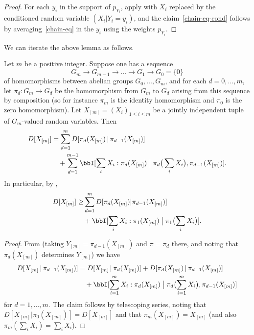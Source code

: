   \begin{proof}\leanok
  For each $y_i$ in the support of $p_{Y_i}$, apply  with $X_i$ replaced by the conditioned random variable $(X_i|Y_i=y_i)$, and the claim~\eqref{chain-eq-cond} follows by averaging~\eqref{chain-eq} in the $y_i$ using the weights $p_{Y_i}$.
  \end{proof}

  We can iterate the above lemma as follows.

  \begin{lemma}\label{multidist-chain-rule-iter}\leanok  Let $m$ be a positive integer.
    Suppose one has a sequence
    \begin{equation}\label{g-seq}
      G_m \to G_{m-1} \to \dots \to G_1 \to G_0 = \{0\}
    \end{equation}
    of homomorphisms between abelian groups $G_0,\dots,G_m$, and for each $d=0,\dots,m$, let $\pi_d : G_m \to G_d$ be the homomorphism from $G_m$ to $G_d$ arising from this sequence by composition (so for instance $\pi_m$ is the identity homomorphism and $\pi_0$ is the zero homomorphism).
    Let $X_{[m]} = (X_i)_{1 \leq i \leq m}$ be a jointly independent tuple of $G_m$-valued random variables.
    Then
    \begin{equation}
      \begin{split}
        D[ X_{[m]} ] &=  \sum_{d=1}^m D[ \pi_d(X_{[m]}) \,|\, \pi_{d-1}(X_{[m]})] \\
         &\quad + \sum_{d=1}^{m-1} \bbI[ \sum_i X_i : \pi_d(X_{[m]}) \; \big| \; \pi_d\big(\sum_i X_i\big), \pi_{d-1}(X_{[m]}) ].
      \end{split}\label{chain-eq-cond'}
    \end{equation}
    In particular, by ,
    \begin{align}\nonumber
        D[ X_{[m]} ] \geq  & \sum_{d=1}^m D[ \pi_d(X_{[m]})|\pi_{d-1}(X_{[m]}) ] \\
         & + \bbI[ \sum_i X_i : \pi_1(X_{[m]}) \; \big| \; \pi_1\bigl(\sum_i X_i\bigr) ].\label{chain-eq-cond''}
    \end{align}
  \end{lemma}

  \begin{proof}\leanok
  From  (taking $Y_{[m]} = \pi_{d-1}(X_{[m]})$ and $\pi = \pi_d$ there, and noting that $\pi_d(X_{[m]})$ determines $Y_{[m]}$) we have
  \begin{align*}
    D[ X_{[m]} \,|\, \pi_{d-1}(X_{[m]}) ] &=  D[ X_{[m]} \,|\, \pi_d(X_{[m]}) ] + D[  \pi_d(X_{[m]})\,|\,\pi_{d-1}(X_{[m]}) ] \\
                                             &\quad + \bbI[ \sum_{i=1}^m X_i : \pi_d(X_{[m]}) \; \big| \; \pi_d\bigl(\sum_{i=1}^m X_i\bigr), \pi_{d-1}(X_{[m]}) ]
  \end{align*}
  for $d=1,\dots,m$. The claim follows by telescoping series, noting that $D[X_{[m]} | \pi_0(X_{[m]})] = D[X_{[m]}]$ and that $\pi_m(X_{[m]})=X_{[m]}$ (and also $\pi_m( \sum_i X_i ) = \sum_i X_i$).
  \end{proof}

